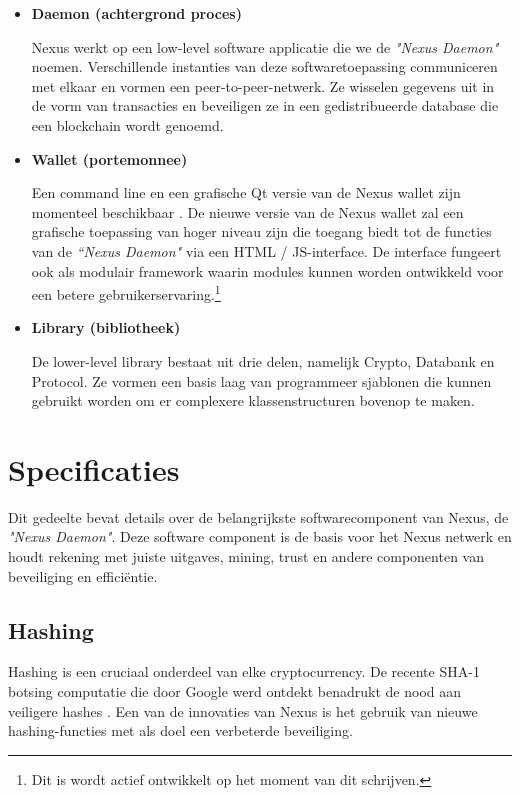 \documentclass[11pt]{article}
\begin{document}
\begin{itemize}
\item \textbf{Daemon (achtergrond proces)}

Nexus werkt op een low-level software applicatie die we de \textit{"Nexus Daemon"} noemen.
Verschillende instanties van deze softwaretoepassing communiceren met elkaar en vormen een peer-to-peer-netwerk. Ze wisselen gegevens uit in de vorm van transacties en beveiligen ze in een gedistribueerde database die een blockchain wordt genoemd.

\item \textbf{Wallet (portemonnee)}

Een command line en een grafische Qt versie van de Nexus wallet zijn momenteel beschikbaar \cite{githubnexusreleases} \cite{nexusearth}.
De nieuwe versie van de Nexus wallet zal een grafische toepassing van hoger niveau zijn die toegang biedt tot de functies van de \textit{``Nexus Daemon"} via een HTML / JS-interface. 
De interface fungeert ook als modulair framework waarin modules kunnen worden ontwikkeld voor een betere gebruikerservaring.\footnote{Dit is wordt actief ontwikkelt op het moment van dit schrijven.}

\item \textbf{Library (bibliotheek)}

De lower-level library bestaat uit drie delen, namelijk Crypto, Databank en Protocol. Ze vormen een basis laag van programmeer sjablonen die kunnen  gebruikt worden om er complexere klassenstructuren bovenop te maken. 

\end{itemize}

\section{Specificaties}

Dit gedeelte bevat details over de belangrijkste softwarecomponent van Nexus, de \textit{"Nexus Daemon"}.
Deze software component is de basis voor het Nexus netwerk en houdt rekening met juiste uitgaves, mining, trust en andere componenten van beveiliging en effici\"entie.
 

\subsection{Hashing}

Hashing is een cruciaal onderdeel van elke cryptocurrency. 
De recente SHA-1 botsing computatie die door Google werd ontdekt benadrukt de nood aan veiligere hashes \cite{googlesha1}. 
Een van de innovaties van Nexus is het gebruik van nieuwe hashing-functies met als doel een verbeterde beveiliging.
\end{document}
